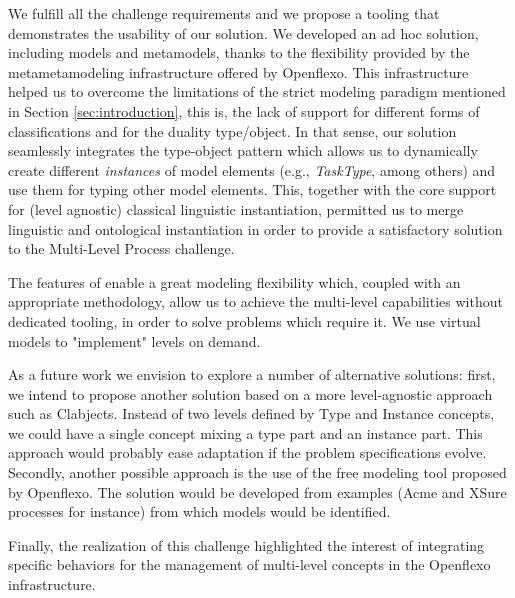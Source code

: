 

We fulfill all the challenge requirements and we propose a tooling that
demonstrates the usability of our solution. We developed an ad hoc solution,
including models and metamodels, thanks to the flexibility provided by the
metametamodeling infrastructure offered by Openflexo. This infrastructure helped us to overcome the limitations of the strict modeling paradigm mentioned in Section \ref{sec:introduction}, this is, the lack of support for different forms of classifications and for the duality type/object. In that sense, our solution seamlessly integrates the type-object pattern which allows us to dynamically create different \emph{instances} of model elements (e.g., \emph{TaskType}, among others) and use them for typing other model elements. This, together with the \FML core support for (level agnostic) classical linguistic instantiation, permitted us to merge linguistic and ontological instantiation in order to provide a satisfactory solution to the Multi-Level Process challenge.

The features of \FML enable a great modeling flexibility which, coupled with an appropriate methodology, allow us to achieve 
the multi-level capabilities without dedicated tooling, in order to solve problems which require it. We use virtual models to "implement" levels on demand.

As a future work we envision to explore a number of alternative solutions:
first, we intend to propose another solution based on a more level-agnostic
approach such as Clabjects. Instead of two levels defined by Type and Instance
concepts, we could have a single concept mixing a type part and an instance
part. This approach would probably ease adaptation if the problem
specifications evolve. Secondly, another possible approach is the use of the
free modeling tool proposed by Openflexo. The solution would be developed from
examples (Acme and XSure processes for instance) from which models would be
identified.

Finally, the realization of this challenge highlighted the interest
of integrating specific behaviors for the management of multi-level concepts in
the Openflexo infrastructure. %
